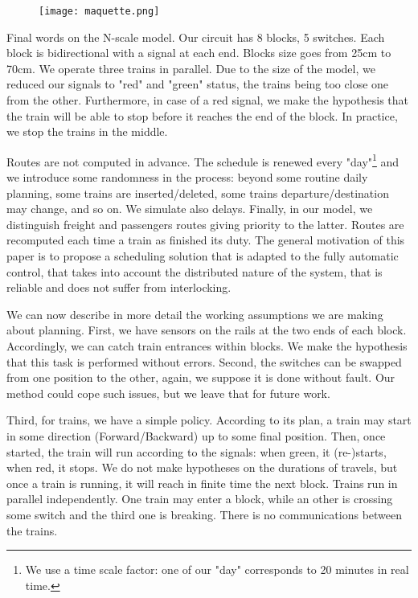 \documentclass[runningheads]{llncs}
\begin{document}
\begin{figure}
 \begin{minipage}{0.28\textwidth}
        \centering
        \vspace{-8mm}
\texttt{[image: maquette.png]}
    \end{minipage}
\end{figure}

Final words on the N-scale model. Our circuit has 8 blocks, 5 switches. Each block is bidirectional with a signal at each end. Blocks size goes from 25cm to 70cm.  We operate  three trains in parallel. Due to the size of the model, we reduced our signals  to "red" and "green" status, the trains being too close one from the other. Furthermore, in case of a red signal, we make the hypothesis that the train will be able to stop before it reaches the end of the block. In practice, we stop the trains in the middle. 


Routes are not computed in advance. The schedule is renewed every "day"\footnote{We use a time scale factor: one of our "day" corresponds to 20 minutes in real time.}  and we introduce some randomness in the process: beyond some routine daily planning, some trains are inserted/deleted, some trains departure/destination may change, and so on. We simulate also delays. Finally, in our model, we distinguish freight and  passengers routes giving priority to the latter. Routes are recomputed each time a train as finished its duty. The general motivation of this paper is to propose a scheduling solution that is adapted to the fully automatic control, that takes into account the distributed nature of the system, that is reliable and does not suffer from interlocking.  
 
We can now describe in more detail the working assumptions we are making about planning.  First, we have sensors on the rails at the two ends of each block. Accordingly,  we can catch train entrances within blocks. We make the hypothesis that this task is performed without errors. Second, the switches can be swapped from one position to the other, again, we suppose it is done without fault. Our method could cope such issues, but we leave that for future work. 
 
  Third, for trains, we have a simple policy.  According to its plan, a train may start in some direction (Forward/Backward) up to some final position. Then, once started, the train will run according to the signals: when green, it (re-)starts, when red, it stops.  We do not make hypotheses on the durations of travels, but once a train is running, it will reach in finite time the next block. Trains run in parallel independently. One train may enter a block, while an other is crossing some switch and the third one is breaking. There is no communications between the trains.
\end{document}
